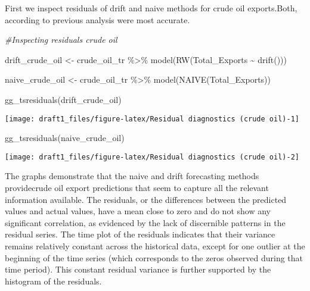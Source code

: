 \documentclass[
]{article}
\newenvironment{Shaded}{\begin{snugshade}}{\end{snugshade}}
\newcommand{\CommentTok}[1]{\textcolor[rgb]{0.56,0.35,0.01}{\textit{#1}}}
\newcommand{\FunctionTok}[1]{\textcolor[rgb]{0.00,0.00,0.00}{#1}}
\newcommand{\NormalTok}[1]{#1}
\newcommand{\OtherTok}[1]{\textcolor[rgb]{0.56,0.35,0.01}{#1}}
\newcommand{\SpecialCharTok}[1]{\textcolor[rgb]{0.00,0.00,0.00}{#1}}
\begin{document}
First we inspect residuals of drift and naive methods for crude oil
exports.Both, according to previous analysis were most accurate.

\begin{Shaded}
\begin{Highlighting}[]
\CommentTok{\#Inspecting residuals crude oil}

\NormalTok{drift\_crude\_oil }\OtherTok{\textless{}{-}}\NormalTok{ crude\_oil\_tr }\SpecialCharTok{\%\textgreater{}\%} 
  \FunctionTok{model}\NormalTok{(}\FunctionTok{RW}\NormalTok{(Total\_Exports }\SpecialCharTok{\textasciitilde{}} \FunctionTok{drift}\NormalTok{()))}

\NormalTok{naive\_crude\_oil }\OtherTok{\textless{}{-}}\NormalTok{ crude\_oil\_tr }\SpecialCharTok{\%\textgreater{}\%} 
  \FunctionTok{model}\NormalTok{(}\FunctionTok{NAIVE}\NormalTok{(Total\_Exports))}

\FunctionTok{gg\_tsresiduals}\NormalTok{(drift\_crude\_oil)}
\end{Highlighting}
\end{Shaded}

\begin{center}\texttt{[image: draft1\_files/figure-latex/Residual diagnostics (crude oil)-1]} \end{center}

\begin{Shaded}
\begin{Highlighting}[]
\FunctionTok{gg\_tsresiduals}\NormalTok{(naive\_crude\_oil)}
\end{Highlighting}
\end{Shaded}

\begin{center}\texttt{[image: draft1\_files/figure-latex/Residual diagnostics (crude oil)-2]} \end{center}

The graphs demonstrate that the naive and drift forecasting methods
providecrude oil export predictions that seem to capture all the
relevant information available. The residuals, or the differences
between the predicted values and actual values, have a mean close to
zero and do not show any significant correlation, as evidenced by the
lack of discernible patterns in the residual series. The time plot of
the residuals indicates that their variance remains relatively constant
across the historical data, except for one outlier at the beginning of
the time series (which corresponds to the zeros observed during that
time period). This constant residual variance is further supported by
the histogram of the residuals.
\end{document}
